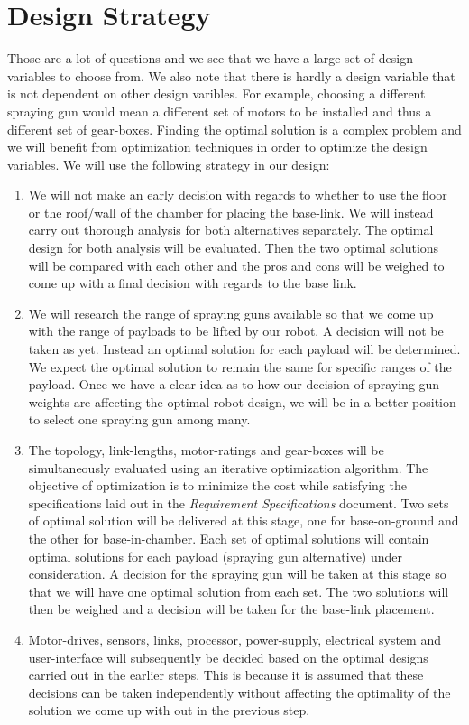 \documentclass[a4paper,10pt]{article}
\begin{document}
\section{Design Strategy}
Those are a lot of questions and we see that we have a large set of design variables to choose from. We also note
that there is hardly a design variable that is not dependent on other design varibles. For example, choosing a different
spraying gun would mean a different set of motors to be installed and thus a different set of gear-boxes. Finding the optimal solution
is a complex problem and we will benefit from optimization techniques in order to optimize the design variables. We will use the
following strategy in our design:
\begin{enumerate}
 \item We will not make an early decision with regards to whether to use the floor or the roof/wall of the chamber for placing the base-link. We will instead carry 
 out thorough analysis for both alternatives separately. The optimal design for both analysis will be evaluated. Then the two optimal solutions will be compared
 with each other and the pros and cons will be weighed to come up with a final decision with regards to the base link.
 \item We will research the range of spraying guns available so that we come up with the range of payloads to be lifted by our robot. A decision will not be taken
 as yet. Instead an optimal solution for each payload will be determined. We expect the optimal solution to remain the same for specific ranges of the payload.
 Once we have a clear idea as to how our decision of spraying gun weights are affecting the optimal robot design, we will be in a better position to select one
 spraying gun among many.
 \item The topology, link-lengths, motor-ratings and gear-boxes will be simultaneously evaluated using an iterative optimization algorithm. The objective of optimization
 is to minimize the cost while satisfying the specifications laid out in the \emph{Requirement Specifications} document. Two sets of optimal solution
 will be delivered at this stage, one for base-on-ground and the other for base-in-chamber. Each set of optimal solutions will contain optimal solutions for 
 each payload (spraying gun alternative) under consideration. A decision for the spraying gun will be taken at this stage so that we will have one optimal 
 solution from each set. The two solutions will then be weighed and a decision will be taken for the base-link placement.
 \item Motor-drives, sensors, links, processor, power-supply, electrical system and user-interface will subsequently be decided based on the optimal designs 
 carried out in the earlier steps. This is because it is assumed that these decisions can be taken independently without affecting the optimality of the solution we come up with
 out in the previous step.
\end{enumerate}
\end{document}
